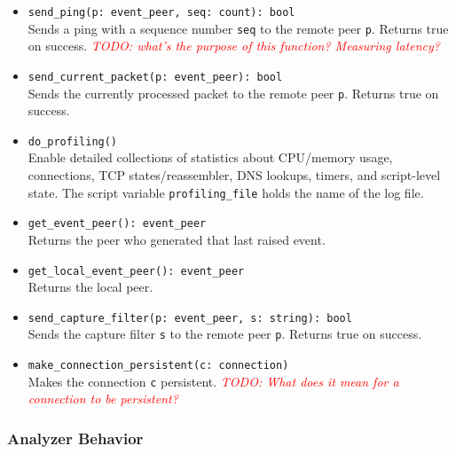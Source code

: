 \documentclass[10pt,landscape]{article}
\def\todo#1{\textit{\textcolor{red}{TODO: #1}}}
\newcommand{\ReturnsTrueOnSuccess}{Returns true on success.\xspace}
\begin{document}
\begin{multicols*}{2}
\begin{itemize}
    \ReturnsTrueOnSuccess
  \item \verb|send_ping(p: event_peer, seq: count): bool|\\
    Sends a ping with a sequence number \verb|seq| to the remote peer \verb|p|.
    \ReturnsTrueOnSuccess
    \todo{what's the purpose of this function? Measuring latency?}
  \item \verb|send_current_packet(p: event_peer): bool|\\
    Sends the currently processed packet to the remote peer \verb|p|.
    \ReturnsTrueOnSuccess
  \item \verb|do_profiling()|\\
    Enable detailed collections of statistics about CPU/memory usage,
    connections, TCP states/reassembler, DNS lookups, timers, and script-level
    state. The script variable \verb|profiling_file| holds the name of the log
    file.
  \item \verb|get_event_peer(): event_peer|\\
    Returns the peer who generated that last raised event.
  \item \verb|get_local_event_peer(): event_peer|\\
    Returns the local peer.
  \item \verb|send_capture_filter(p: event_peer, s: string): bool|\\
    Sends the capture filter \verb|s| to the remote peer \verb|p|.
    \ReturnsTrueOnSuccess
  \item \verb|make_connection_persistent(c: connection)|\\
    Makes the connection \verb|c| persistent. \todo{What does it mean for a
    connection to be persistent?}
\end{itemize}

\subsubsection*{Analyzer Behavior}


\end{multicols*}
\end{document}
